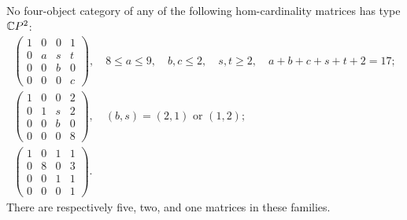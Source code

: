 \begin{proposition}
\label{CP2:A-four17-large-corner-profiles}
No four-object category of any of the following hom-cardinality
matrices has type $\mathbb{C}P^2$:
\[
\begin{gathered}
\begin{pmatrix}
1&0&0&1\\0&a&s&t\\0&0&b&0\\0&0&0&c
\end{pmatrix},
\quad 8\leq a\leq9,\quad b,c\leq2,\quad s,t\geq2,
\quad a+b+c+s+t+2=17;\\[3pt]
\begin{pmatrix}
1&0&0&2\\0&1&s&2\\0&0&b&0\\0&0&0&8
\end{pmatrix},
\quad (b,s)=(2,1)\text{ or }(1,2);\\[3pt]
\begin{pmatrix}
1&0&1&1\\0&8&0&3\\0&0&1&1\\0&0&0&1
\end{pmatrix}.
\end{gathered}
\]
There are respectively five, two, and one matrices in these families.
\end{proposition}
